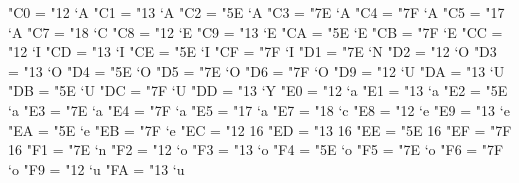 %
%
%
%
%
%

\def\english{\language=0}
\charsubdef "C0 = "12 `A		%
\charsubdef "C1 = "13 `A		%
\charsubdef "C2 = "5E `A		%
\charsubdef "C3 = "7E `A		%
\charsubdef "C4 = "7F `A		%
\charsubdef "C5 = "17 `A		%
\charsubdef "C7 = "18 `C		%
\charsubdef "C8 = "12 `E		%
\charsubdef "C9 = "13 `E		%
\charsubdef "CA = "5E `E		%
\charsubdef "CB = "7F `E		%
\charsubdef "CC = "12 `I		%
\charsubdef "CD = "13 `I		%
\charsubdef "CE = "5E `I		%
\charsubdef "CF = "7F `I		%
\charsubdef "D1 = "7E `N		%
\charsubdef "D2 = "12 `O		%
\charsubdef "D3 = "13 `O		%
\charsubdef "D4 = "5E `O		%
\charsubdef "D5 = "7E `O		%
\charsubdef "D6 = "7F `O		%
\charsubdef "D9 = "12 `U		%
\charsubdef "DA = "13 `U		%
\charsubdef "DB = "5E `U		%
\charsubdef "DC = "7F `U		%
\charsubdef "DD = "13 `Y		%
\charsubdef "E0 = "12 `a		%
\charsubdef "E1 = "13 `a		%
\charsubdef "E2 = "5E `a		%
\charsubdef "E3 = "7E `a		%
\charsubdef "E4 = "7F `a		%
\charsubdef "E5 = "17 `a		%
\charsubdef "E7 = "18 `c		%
\charsubdef "E8 = "12 `e		%
\charsubdef "E9 = "13 `e		%
\charsubdef "EA = "5E `e		%
\charsubdef "EB = "7F `e		%
\charsubdef "EC = "12 16		%
\charsubdef "ED = "13 16		%
\charsubdef "EE = "5E 16		%
\charsubdef "EF = "7F 16		%
\charsubdef "F1 = "7E `n		%
\charsubdef "F2 = "12 `o		%
\charsubdef "F3 = "13 `o		%
\charsubdef "F4 = "5E `o		%
\charsubdef "F5 = "7E `o		%
\charsubdef "F6 = "7F `o		%
\charsubdef "F9 = "12 `u		%
\charsubdef "FA = "13 `u		%
